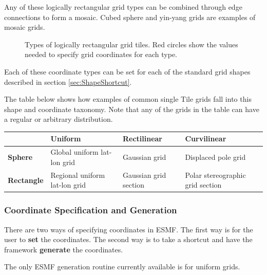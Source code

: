 Any of these logically rectangular grid types can be combined through edge
connections to form a mosaic.  Cubed sphere and yin-yang grids are examples
of mosaic grids.
 
\begin{figure}
\caption{Types of logically rectangular grid tiles.  Red circles show the
values needed to specify grid coordinates for each type.}
\label{fig:LogRectGrids}
\end{figure}

Each of these coordinate types can be set for each of the standard grid shapes
described in section \ref{sec:ShapeShortcut}.  

The table below shows how examples of common single Tile grids fall 
into this shape and coordinate taxonomy.  Note that any
of the grids in the table can have a regular or arbitrary distribution.

\medskip
\begin{tabular}{|p{.9in}|p{1.7in}|p{1.7in}|p{1.7in}|}
\hline
 & {\bf Uniform} & {\bf Rectilinear} & {\bf Curvilinear} \\ 
\hline
{\bf Sphere} & Global uniform lat-lon grid & Gaussian grid & Displaced pole grid \\
\hline
{\bf Rectangle} & Regional uniform lat-lon grid & Gaussian grid section & Polar stereographic grid section\\
\hline
\end{tabular}

\subsubsection{Coordinate Specification and Generation}

There are two ways of specifying coordinates in ESMF.  The
first way is for the user to {\bf set} the coordinates.  The second 
way is to take a shortcut and have the framework {\bf generate}
the coordinates.  

The only ESMF generation routine currently available is for uniform grids.

